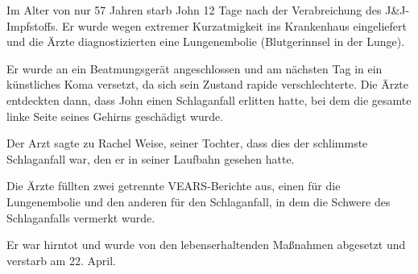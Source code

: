 Im Alter von nur 57 Jahren starb John 12 Tage nach der Verabreichung des
J\&J-Impfstoffs. Er wurde wegen extremer Kurzatmigkeit ins Krankenhaus
eingeliefert und die Ärzte diagnostizierten eine Lungenembolie (Blutgerinnsel in
der Lunge).

Er wurde an ein Beatmungsgerät angeschlossen und am nächsten Tag in ein
künstliches Koma versetzt, da sich sein Zustand rapide verschlechterte. Die
Ärzte entdeckten dann, dass John einen Schlaganfall erlitten hatte, bei dem die
gesamte linke Seite seines Gehirns geschädigt wurde.

Der Arzt sagte zu Rachel Weise, seiner Tochter, dass dies der schlimmste
Schlaganfall war, den er in seiner Laufbahn gesehen hatte.

Die Ärzte füllten zwei getrennte VEARS-Berichte aus, einen für die Lungenembolie
und den anderen für den Schlaganfall, in dem die Schwere des Schlaganfalls
vermerkt wurde.

Er war hirntot und wurde von den lebenserhaltenden Maßnahmen abgesetzt und
verstarb am 22. April.
